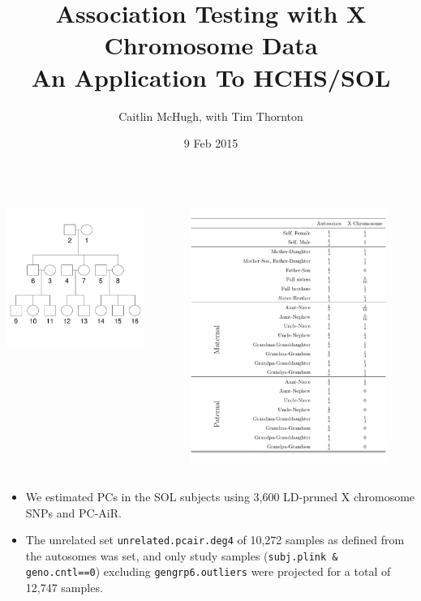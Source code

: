 \documentclass{beamer}
\title[Association Testing with X Chromosome Data] %
{Association Testing with X Chromosome Data\\
An Application To HCHS/SOL}
\author[Caitlin McHugh, with Tim Thornton] %
{Caitlin McHugh, with Tim Thornton}
\institute[University of Washington] %
{
  Department of Biostatistics\\
  University of Washington
}
\date[Short Occasion] %
{9 Feb 2015}
\begin{document}
\begin{frame}
  \titlepage
\end{frame}



\begin{frame}
\begin{columns}
    \begin{column}{0.3\textwidth}
      \centering
      \includegraphics[height=4.5cm]{../pedigree_16individs.pdf}
    \end{column}
    \begin{column}{0.5\textwidth}
      \centering
      \includegraphics[height=8.3cm]{../olga_presentation_26jan15/xchr_kc_values.pdf}
    \end{column}
 \end{columns}
\end{frame}

\begin{frame}
\begin{itemize}
\item We estimated PCs in the SOL subjects using 3,600 LD-pruned X chromosome SNPs and PC-AiR.
\item The unrelated set \texttt{unrelated.pcair.deg4} of 10,272 samples as defined from the autosomes was set, and only study samples (\texttt{subj.plink \& geno.cntl==0}) excluding \texttt{gengrp6.outliers} were projected for a total of 12,747 samples.
\end{itemize}
\end{frame}
\end{document}

